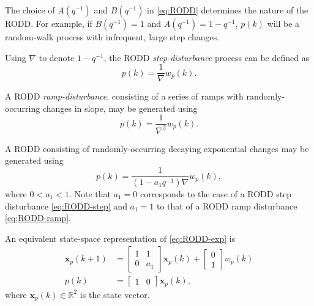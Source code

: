The choice of $A(q^{-1})$ and $B(q^{-1})$ in \eqref{eq:RODD} determines the nature of the \gls{RODD}. For example, if $B(q^{-1})=1$ and $A(q^{-1})=1-q^{-1}$, $p(k)$ will be a random-walk process with infrequent, large step changes.

Using $\nabla$ to denote $1-q^{-1}$, the \gls{RODD} \textit{step-disturbance} process can be defined as
%
\begin{equation} \label{eq:RODD-step}
	p(k) = \frac{1}{\nabla}w_p(k).
\end{equation}

A \gls{RODD} \textit{ramp-disturbance}, consisting of a series of ramps with randomly-occurring changes in slope, may be generated using
\begin{equation} \label{eq:RODD-ramp}
	p(k) = \frac{1}{\nabla^2}w_p(k).
\end{equation}

A \gls{RODD} consisting of randomly-occurring decaying exponential changes may be generated using
\begin{equation} \label{eq:RODD-exp}
	p(k) = \frac{1}{(1-a_1q^{-1})\nabla}w_p(k),
\end{equation}
where  $0<a_1<1$. Note that $a_1=0$ corresponds to the case of a \gls{RODD} step disturbance \eqref{eq:RODD-step} and $a_1=1$ to that of a \gls{RODD} ramp disturbance \eqref{eq:RODD-ramp}. 

An equivalent state-space representation of \eqref{eq:RODD-exp} is
\begin{equation} \label{eq:RODD-ss}
	\begin{split}
		\mathbf{x}_p(k+1) & =\left[\begin{array}{cc}
			1 & 1 \\
			0 & a_1
		\end{array}\right] \mathbf{x}_p(k) +\left[\begin{array}{cc}
			0 \\
			1
		\end{array}\right] w_p(k) \\
		p(k) & =\left[\begin{array}{cc}
			1 & 0
		\end{array}\right] \mathbf{x}_p(k),
	\end{split}
\end{equation}
%
where $\mathbf{x}_p(k) \in \mathbb{R}^2$ is the state vector.

